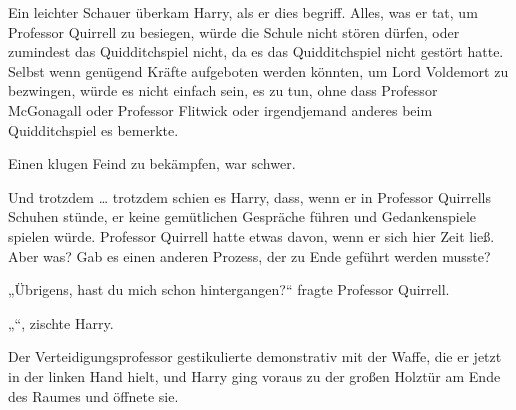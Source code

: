 Ein leichter Schauer überkam Harry, als er dies begriff. Alles, was er tat, um Professor Quirrell zu besiegen, würde die Schule nicht stören dürfen, oder zumindest das Quidditchspiel nicht, da es das Quidditchspiel nicht gestört hatte. Selbst wenn genügend Kräfte aufgeboten werden könnten, um Lord Voldemort zu bezwingen, würde es nicht einfach sein, es zu tun, ohne dass Professor McGonagall oder Professor Flitwick oder irgendjemand anderes beim Quidditchspiel es bemerkte.

Einen klugen Feind zu bekämpfen, war schwer.

Und trotzdem … trotzdem schien es Harry, dass, wenn er in Professor Quirrells Schuhen stünde, er keine gemütlichen Gespräche führen und Gedankenspiele spielen würde. Professor Quirrell hatte etwas davon, wenn er sich hier Zeit ließ. Aber was? Gab es einen anderen Prozess, der zu Ende geführt werden musste?

„Übrigens, hast du mich schon hintergangen?“ fragte Professor Quirrell.

„“, zischte Harry.

Der Verteidigungsprofessor gestikulierte demonstrativ mit der Waffe, die er jetzt in der linken Hand hielt, und Harry ging voraus zu der großen Holztür am Ende des Raumes und öffnete sie.

\later

